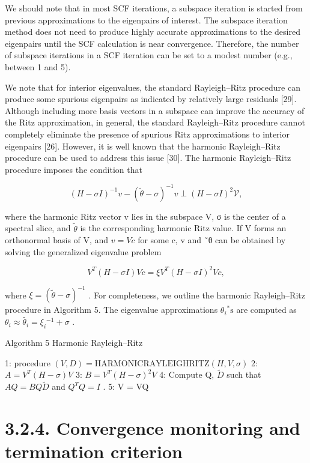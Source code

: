 \documentclass[
  10
]{article}
\begin{document}
We should note that in most SCF iterations, a subspace iteration is
started from previous approximations to the eigenpairs of interest. The
subspace iteration method does not need to produce highly accurate
approximations to the desired eigenpairs until the SCF calculation is
near convergence. Therefore, the number of subspace iterations in a SCF
iteration can be set to a modest number (e.g., between 1 and 5).

We note that for interior eigenvalues, the standard Rayleigh--Ritz
procedure can produce some spurious eigenpairs as indicated by
relatively large residuals {[}29{]}. Although including more basis
vectors in a subspace can improve the accuracy of the Ritz
approximation, in general, the standard Rayleigh--Ritz procedure cannot
completely eliminate the presence of spurious Ritz approximations to
interior eigenpairs {[}26{]}. However, it is well known that the
harmonic Rayleigh--Ritz procedure can be used to address this issue
{[}30{]}. The harmonic Rayleigh--Ritz procedure imposes the condition
that

\[
(H - \sigma I) ^ {- 1} v - (\tilde {\theta} - \sigma) ^ {- 1} v \perp (H - \sigma I) ^ {2} \mathcal {V}, \tag {13}
\]

where the harmonic Ritz vector v lies in the subspace V, σ is the center
of a spectral slice, and \(\tilde { \theta }\) is the corresponding
harmonic Ritz value. If V forms an orthonormal basis of V, and
\(v = V c\) for some c, v and ˜θ can be obtained by solving the
generalized eigenvalue problem

\[
V ^ {T} (H - \sigma I) V c = \xi V ^ {T} (H - \sigma I) ^ {2} V c, \tag {14}
\]

where \(\xi = ( \tilde { \theta } - \sigma ) ^ { - 1 }\) . For
completeness, we outline the harmonic Rayleigh--Ritz procedure in
Algorithm 5. The eigenvalue approximations
\(\theta _ { i } \mathrm { { ^ { * } s } }\) are computed as
\(\theta _ { i } \approx \tilde { \theta _ { i } } = \xi _ { i } { } ^ { - 1 } + \sigma\)
.

Algorithm 5 Harmonic Rayleigh--Ritz

1: procedure \((V,D)=\text{HARMONICRAYLEIGHRITZ}(H,V,\sigma)\) 2:
\(A=V^{T}(H-\sigma)V\) 3: \(B=V^{T}(H-\sigma)^{2}V\) 4: Compute Q,
\(\tilde{D}\) such that \(AQ=BQ\tilde{D}\) and \(Q^{T}Q=I\) . 5: V = VQ

\section{3.2.4. Convergence monitoring and termination
criterion}\label{convergence-monitoring-and-termination-criterion}
\end{document}
